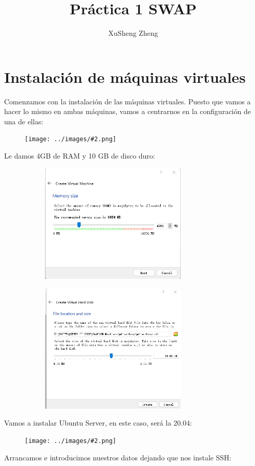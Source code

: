 \documentclass[twoside]{article}
\title{Práctica 1 SWAP}
\author{XuSheng Zheng}
\date{}
\newcommand{\image}[2]{
\begin{figure}[H]
    \texttt{[image: ../images/\#2.png]}
    \centering
\end{figure}
}
\begin{document}
\maketitle
\tableofcontents
\newpage
\section{Instalación de máquinas virtuales}
Comenzamos con la instalación de las máquinas virtuales. Puesto que vamos a hacer lo mismo en ambas máquinas, vamos a centrarnos en la configuración de una de ellas:
\image{8}{1}
Le damos 4GB de RAM y 10 GB de disco duro:
\begin{figure}[H]
    \centering
    \begin{subfigure}{.5\textwidth}
        \centering
        \includegraphics[width=7cm]{../images/2.png}
    \end{subfigure}%
    \begin{subfigure}{.5\textwidth}
        \centering
        \includegraphics[width=7cm]{../images/3.png}
    \end{subfigure}
\end{figure}
Vamos a instalar Ubuntu Server, en este caso, será la 20.04:
\image{8}{4}
Arrancamos e introducimos nuestros datos dejando que nos instale SSH:
\end{document}
